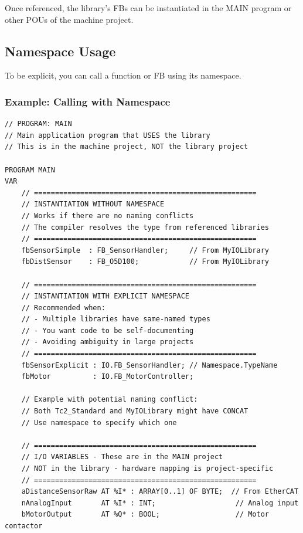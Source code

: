 \documentclass[11pt,a4paper]{article}
\begin{document}
Once referenced, the library's FBs can be instantiated in the MAIN program or other POUs of the machine project.

\subsection{Namespace Usage}

To be explicit, you can call a function or FB using its namespace.

\subsubsection*{Example: Calling with Namespace}

\begin{lstlisting}
// PROGRAM: MAIN
// Main application program that USES the library
// This is in the machine project, NOT the library project

PROGRAM MAIN
VAR
    // =====================================================
    // INSTANTIATION WITHOUT NAMESPACE
    // Works if there are no naming conflicts
    // The compiler resolves the type from referenced libraries
    // =====================================================
    fbSensorSimple  : FB_SensorHandler;     // From MyIOLibrary
    fbDistSensor    : FB_O5D100;            // From MyIOLibrary
    
    // =====================================================
    // INSTANTIATION WITH EXPLICIT NAMESPACE
    // Recommended when:
    // - Multiple libraries have same-named types
    // - You want code to be self-documenting
    // - Avoiding ambiguity in large projects
    // =====================================================
    fbSensorExplicit : IO.FB_SensorHandler; // Namespace.TypeName
    fbMotor          : IO.FB_MotorController;
    
    // Example with potential naming conflict:
    // Both Tc2_Standard and MyIOLibrary might have CONCAT
    // Use namespace to specify which one
    
    // =====================================================
    // I/O VARIABLES - These are in the MAIN project
    // NOT in the library - hardware mapping is project-specific
    // =====================================================
    aDistanceSensorRaw AT %I* : ARRAY[0..1] OF BYTE;  // From EtherCAT
    nAnalogInput       AT %I* : INT;                   // Analog input
    bMotorOutput       AT %Q* : BOOL;                  // Motor contactor
    

\end{lstlisting}
\end{document}
